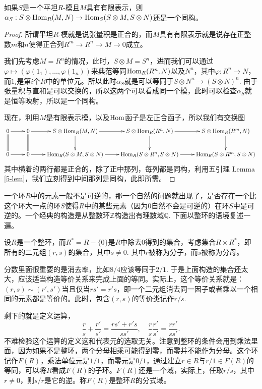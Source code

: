 \begin{pro}\label{3.5.5}
	如果$S$是一个平坦$R$-模且$M$具有有限表示，则$\alpha_S:S\otimes\operatorname{Hom}_R(M,N)\to \operatorname{Hom}_S(S\otimes M,S\otimes N)$还是一个同构。
\end{pro}

\begin{proof}
	所谓平坦$R$-模就是说张量积是正合的，而$M$具有有限表示就是说存在正整数$m$和$n$使得正合列$R^m\to R^n \to M\to 0$成立。

	我们先考虑$M=R^n$的情况，此时，$S\otimes M=S^n$，进而我们可以通过$\varphi\mapsto (\varphi(1_1),\dots,\varphi(1_n))$来典范等同$\operatorname{Hom}_R(R^n,N)$以及$N^n$，其中$\varphi:R^n\to N$，而$1_i$是第$i$个$R$中的单位元。所以此时$\alpha_S$就是可以等同于$S\otimes N^n\to (S\otimes N)^n$. 由于张量积与直和是可以交换的，所以这两个可以看成同一个模，此时可以检查$\alpha_S$就是恒等映射，所以是一个同构。

	现在，利用$M$是有限表示模，以及$\operatorname{Hom}$函子是左正合函子，所以我们有交换图
	\[
	\begin{xy}
		\xymatrix{
			0\ar[r]\ar@{=}[d]&0\ar[r]\ar@{=}[d]&S\otimes \Hom_R(M,N)\ar[r]\ar[d]&S\otimes \Hom_R(R^n,N)\ar[r]\ar[d]&S\otimes \Hom_R(R^m,N)\ar[d]\\
			0\ar[r]&0\ar[r]&\Hom_R(S\otimes M,S\otimes N)\ar[r]&\Hom_R(S\otimes R^n,S\otimes N)\ar[r]&\Hom_R(S\otimes R^m,S\otimes N)
		}
	\end{xy}
	\]
	其中横着的两行都是正合的，除了正中那列，每列都是同构，利用五引理 Lemma \ref{5-lem}，我们立刻得到中间那列是同构，此即所需。
\end{proof}

\para[分式域] 一个环$R$中的元素一般不是可逆的，那一个自然的问题就出现了，是否存在一个比这个环大一点的环$S$使得$R$中的某些元素（因为0自然不会是可逆的）在环$S$中是可逆的。一个经典的构造是从整数环$\mathbb{Z}$构造出有理数域$\mathbb{Q}$. 下面以整环的语境复述一遍。

设$R$是一个整环，而$R^{*}=R-\{0\}$是$R$中除去$0$得到的集合，考虑集合$R\times R^{*}$，即所有的二元组$(r,s)$的集合，其中$s\neq 0$. 其中$r$被称为分子，而$s$被称为分母。

分数里面很重要的是消去率，比如$8/4$应该等同于$2/1$. 于是上面构造的集合还太大，应该适当构造等价关系来完成上面的等同。实际上，这个等价关系就是：$(r,s)\sim (r',s')$当且仅当$rs'=r's$，即一个二元组消去同一因子或者乘以一个相同的元素都是等价的。此时，包含$(r,s)$的等价类记作$r/s$.

剩下的就是定义运算，
\[
	\frac{r}{s}+\frac{r'}{s'}=\frac{rs'+r's}{ss'},\quad \frac{r}{s}\frac{r'}{s'}=\frac{rr'}{ss'}.
\]
不难检验这个运算的定义这和代表元的选取无关。注意到整环的条件会用到乘法里面，因为如果不是整环，两个分母相乘可能得到零，而零并不能作为分母。这个环记作$F(R)$，乘法单位元是$1/1$，而零元是$0/1$，通过建立$r\in R$与$r/1\in F(R)$的等同，可以将$R$看成$F(R)$的子环。$F(R)$还是一个域，实际上，任取$r/s$，其中$r\neq 0$，则$s/r$是它的逆。称$F(R)$是整环$R$的分式域。\endpara

